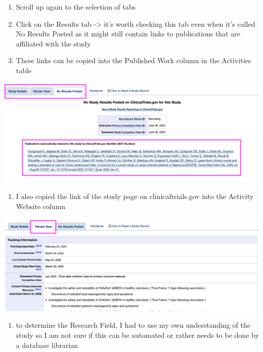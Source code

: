 \documentclass[
]{book}
\providecommand{\tightlist}{%
  \setlength{\itemsep}{0pt}\setlength{\parskip}{0pt}}
\begin{document}
\begin{enumerate}
\def\labelenumi{\arabic{enumi}.}
\setcounter{enumi}{14}
\item
  Scroll up again to the selection of tabs
\item
  Click on the Results tab -\textgreater{} it's worth checking this tab even when it's called No Results Posted as it might still contain links to publications that are affiliated with the study
\item
  These links can be copied into the Published Work column in the Activities table
\end{enumerate}

\includegraphics{images/clinicaltrial7.png}

\begin{enumerate}
\def\labelenumi{\arabic{enumi}.}
\setcounter{enumi}{17}
\tightlist
\item
  I also copied the link of the study page on clinicaltrials.gov into the Activity Website column
\end{enumerate}

\includegraphics{images/clinicaltrial8.png}

\begin{enumerate}
\def\labelenumi{\arabic{enumi}.}
\setcounter{enumi}{18}
\tightlist
\item
  to determine the Research Field, I had to use my own understanding of the study so I am not sure if this can be automated or rather needs to be done by a database librarian
\end{enumerate}
\end{document}
